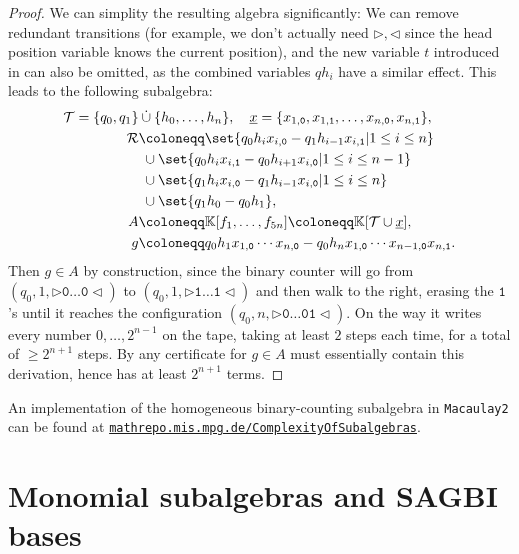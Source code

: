 \documentclass[12pt]{article}
\newcommand{\KK}{\mathbb{K}}
\newcommand{\NULL}{\texttt{0}}
\newcommand{\EINS}{\texttt{1}}
\newcommand{\x}{{\underline x}}
\begin{document}
\begin{proof}
We can simplity the resulting algebra significantly: We can remove redundant transitions (for example, we don't actually need ${\triangleright},{\triangleleft}$ since the head position variable knows the current position), and the new variable $t$ introduced in  can also be omitted, as the combined variables $qh_i$ have a similar effect. This leads to the following subalgebra:
\begin{align*}
\mathcal{T} = \{q_0,q_1\} &\mathbin{\dot\cup} \{h_0,\dots,h_n\}, \quad \x = \{x_{1,\NULL},x_{1,\EINS},\dots,x_{n,\NULL},x_{n,\EINS}\}, \\
\mathcal{R} &\coloneqq \set{q_0h_ix_{i,\NULL} - q_1h_{i-1}x_{i,\EINS} | 1\leq i \leq n} \\
        &{}\; \cup \set{q_0h_ix_{i,\EINS} - q_0h_{i+1}x_{i,\NULL} | 1\leq i \leq n-1} \\
        &{}\; \cup \set{q_1h_ix_{i,\NULL} - q_1h_{i-1}x_{i,\NULL} | 1\leq i \leq n} \\
        &{}\; \cup \set{q_1h_0 - q_0h_1}, \\
  A &\coloneqq \KK[f_1,\dots,f_{5n}] \coloneqq \KK[\mathcal{T} \cup \x], \\
  g &\coloneqq q_0h_1x_{1,\NULL}\dotsm x_{n,\NULL} - q_0h_nx_{1,\NULL}\dotsm x_{n-1,\NULL}x_{n,\EINS}.
\end{align*}
Then $g \in A$ by construction, since the binary counter will go from $(q_0,1,\triangleright\NULL \dots \NULL \triangleleft)$ to $(q_0,1,\triangleright\EINS \dots \EINS \triangleleft)$ and then walk to the right, erasing the $\EINS$'s until it reaches the configuration $(q_0,n,\triangleright\NULL \dots \NULL \EINS \triangleleft)$. On the way it writes every number $0,\dots,2^{n-1}$ on the tape, taking at least $2$ steps each time, for a total of $\geq 2^{n+1}$ steps. By  any certificate for $g \in A$ must essentially contain this derivation, hence has at least $2^{n+1}$ terms.
\end{proof}

An implementation of the homogeneous binary-counting subalgebra in \texttt{Macaulay2} can be found at \href{https://mathrepo.mis.mpg.de/ComplexityOfSubalgebras}{\nolinkurl{mathrepo.mis.mpg.de/ComplexityOfSubalgebras}}.


\section{Monomial subalgebras and SAGBI bases}\label{sec:monomials}
\end{document}

